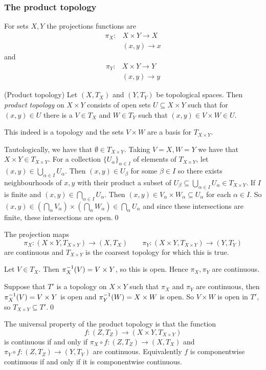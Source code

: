 \documentclass{article}
\begin{document}
\subsubsection{The product topology}
For sets $ X,Y $ the projections functions are
\begin{align*}
	\pi_X : &X\times Y \to X\\
	      &(x,y) \to x
\end{align*}
and
\begin{align*}
	\pi_Y : &X\times Y \to Y\\
	      &(x,y) \to y
\end{align*}
\begin{definition}
	(Product topology) Let $ (X,T_X) $ and $ (Y,T_Y) $ be topological spaces. Then \textit{product topology} on $ X\times Y $ consists of open sets $ U\subseteq X\times Y $ such that for $ (x,y)\in U $ there is a $ V\in T_X $ and $ W\in T_Y $ such that $ (x,y)\in V\times W\in U $.
\end{definition}
\begin{proposition}
	This indeed is a topology and the sets $ V\times W $ are a basis for $ T_{X\times Y} $.
\end{proposition}
\pf Tautologically, we have that $ \emptyset \in T_{X\times Y} $. Taking $ V=X,W=Y $ we have that $ X\times Y\in T_{X\times Y} $. For a collection $ \{U_\alpha\}_{\alpha\in I} $ of elements of $ T_{X\times Y} $, let $ (x,y)\in \bigcup_{\alpha\in I}U_\alpha $. Then $ (x,y)\in U_\beta $ for some $ \beta\in I $ so there exists neighbourhoods of $ x,y $ with their product a subset of $ U_\beta\subseteq \bigcup_{\alpha\in I} U_\alpha \in T_{X\times Y}$.  If $ I $ is finite and $ (x,y)\in \bigcap_{\alpha\in I}U_\alpha $. Then $ (x,y)\in V_\alpha\times W_\alpha \subseteq U_\alpha $ for each $ \alpha\in I $. So $ (x,y)\in \left(\bigcap_\alpha V_\alpha\right)\times\left(\bigcap_\alpha W_\alpha\right)\in \bigcap_\alpha U_\alpha $ and since these intersections are finite, these intersections are open.\qed
\begin{proposition}
  The projection maps 
  \[
	  \pi_X:(X\times Y, T_{X\times Y})\to (X,T_{X})\qquad \pi_Y:(X\times Y,T_{X\times Y})\to (Y,T_Y)
  \]
  are continuous and $ T_{X\times Y} $ is the coarsest topology for which this is true.
\end{proposition}
\pf Let $ V\in T_X $. Then $ {\pi}^{-1}_X(V) = V\times Y $, so this is open. Hence $ \pi_X,\pi_Y $ are continuous.\par
Suppose that $ T' $ is a topology on $ X\times Y $ such that $ \pi_X $ and $ \pi_Y $ are continuous, then $ {\pi}^{-1}_X(V)=V\times Y $ is open and $ {\pi}^{-1}_Y(W)=X\times W $ is open. So $ V\times W $ is open in $ T' $, so $ T_{X\times Y}\subseteq T' $.\qed 
\par
The universal property of the product topology is that the function
\[
	f:(Z,T_Z)\to (X\times Y,T_{X\times Y})
\]
is continuous if and only if $ \pi_X\circ f:(Z,T_Z)\to (X,T_X) $ and $ \pi_Y\circ f:(Z,T_Z)\to (Y,T_Y) $ are continuous. Equivalently $ f $ is componentwise continuous if and only if it is componentwise continuous.
\end{document}

